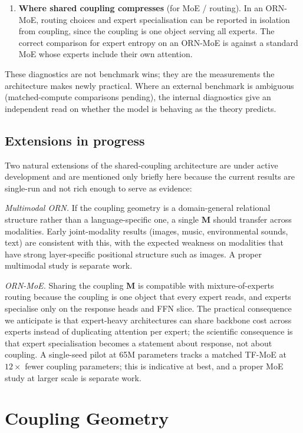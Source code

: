 \documentclass[10pt,twocolumn]{article}
\newcommand{\M}{\mathbf{M}}
\begin{document}
\begin{enumerate}[nosep,leftmargin=1.5em]
\item \textbf{Where shared coupling compresses} (for MoE / routing). In an ORN-MoE, routing choices and expert specialisation can be reported in isolation from coupling, since the coupling is one object serving all experts. The correct comparison for expert entropy on an ORN-MoE is against a standard MoE whose experts include their own attention.
\end{enumerate}

These diagnostics are not benchmark wins; they are the measurements the architecture makes newly practical. Where an external benchmark is ambiguous (matched-compute comparisons pending), the internal diagnostics give an independent read on whether the model is behaving as the theory predicts.

\subsection{Extensions in progress}

Two natural extensions of the shared-coupling architecture are under active development and are mentioned only briefly here because the current results are single-run and not rich enough to serve as evidence:

\emph{Multimodal ORN.} If the coupling geometry is a domain-general relational structure rather than a language-specific one, a single $\M$ should transfer across modalities. Early joint-modality results (images, music, environmental sounds, text) are consistent with this, with the expected weakness on modalities that have strong layer-specific positional structure such as images. A proper multimodal study is separate work.

\emph{ORN-MoE.} Sharing the coupling $\M$ is compatible with mixture-of-experts routing because the coupling is one object that every expert reads, and experts specialise only on the response heads and FFN slice. The practical consequence we anticipate is that expert-heavy architectures can share backbone cost across experts instead of duplicating attention per expert; the scientific consequence is that expert specialisation becomes a statement about response, not about coupling. A single-seed pilot at 65M parameters tracks a matched TF-MoE at $12\times$ fewer coupling parameters; this is indicative at best, and a proper MoE study at larger scale is separate work.


\section{Coupling Geometry}
\label{sec:geometry}
\end{document}
